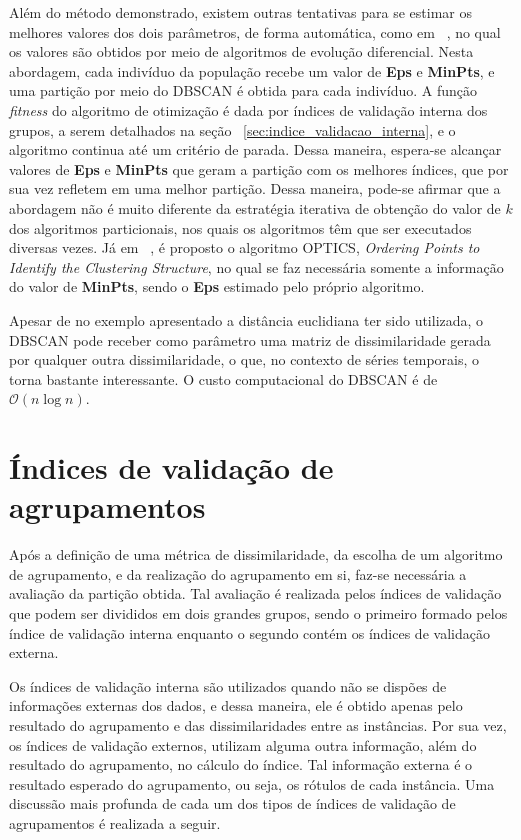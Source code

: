 Além do método demonstrado, existem outras tentativas para se estimar os melhores valores dos dois parâmetros, de forma automática, como em ~\parencite{DE_DBSCAN}, no qual os valores são obtidos por meio de algoritmos de evolução diferencial. Nesta abordagem, cada indivíduo da população recebe um valor de \textbf{Eps} e \textbf{MinPts}, e uma partição por meio do DBSCAN é obtida para cada indivíduo. A função \emph{fitness} do algoritmo de otimização é dada por índices de validação interna dos grupos, a serem detalhados na seção ~\ref{sec:indice_validacao_interna}, e o algoritmo continua até um critério de parada. Dessa maneira, espera-se alcançar valores de  \textbf{Eps} e \textbf{MinPts} que geram a partição com os melhores índices, que por sua vez refletem em uma melhor partição. Dessa maneira, pode-se afirmar que a abordagem não é muito diferente da estratégia iterativa de obtenção do valor de $k$ dos algoritmos particionais, nos quais os algoritmos têm que ser executados diversas vezes. Já em ~\parencite{OPTICS}, é proposto o algoritmo OPTICS, \emph{Ordering Points to Identify the Clustering Structure}, no qual se faz necessária somente a informação do valor de \textbf{MinPts}, sendo o \textbf{Eps} estimado pelo próprio algoritmo. 

Apesar de no exemplo apresentado a distância euclidiana ter sido utilizada, o DBSCAN pode receber como parâmetro uma matriz de dissimilaridade gerada por qualquer outra dissimilaridade, o que, no contexto de séries temporais, o torna bastante interessante. O custo computacional do DBSCAN é de $\mathcal{O}(n \log n)$.

\section{Índices de validação de agrupamentos}

Após a definição de uma métrica de dissimilaridade, da escolha de um algoritmo de agrupamento, e da realização do agrupamento em si, faz-se necessária a avaliação da partição obtida. Tal avaliação é realizada pelos índices de validação que podem ser divididos em dois grandes grupos, sendo o primeiro formado pelos índice de validação interna enquanto o segundo contém os índices de validação externa. 

Os índices de validação interna são utilizados quando não se dispões de informações externas dos dados, e dessa maneira, ele é obtido apenas pelo resultado do agrupamento e das dissimilaridades entre as instâncias. Por sua vez, os índices de validação externos, utilizam alguma outra informação, além do resultado do agrupamento, no cálculo do índice. Tal informação externa é o resultado esperado do agrupamento, ou seja, os rótulos de cada instância. Uma discussão mais profunda de cada um dos tipos de índices de validação de agrupamentos é realizada a seguir.

